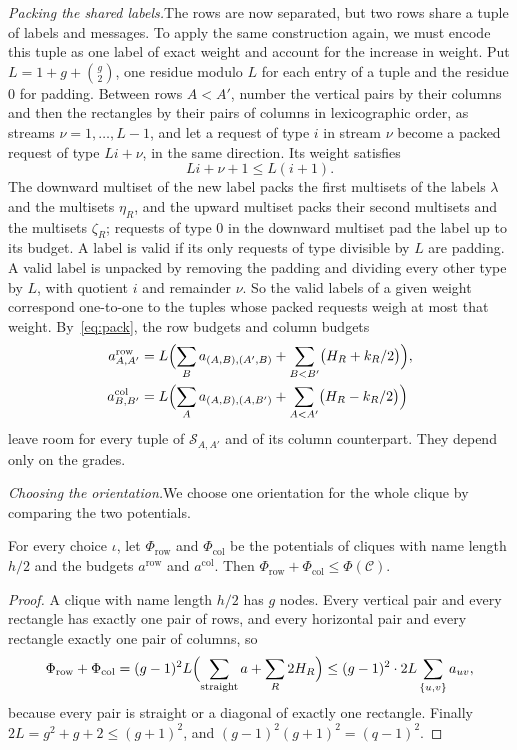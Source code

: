 \documentclass[11pt]{article}
\theoremstyle{definition}
\theoremstyle{definition}
\theoremstyle{remark}
\newcommand{\row}{\mathrm{row}}
\newcommand{\col}{\mathrm{col}}
\begin{document}
\noindent\emph{Packing the shared labels.}\quad The rows are now separated, but two rows share a tuple of labels and messages. To apply the same construction again, we must encode this tuple as one label of exact weight and account for the increase in weight. Put $L=1+g+\binom g2$, one residue modulo $L$ for each entry of a tuple and the residue $0$ for padding. Between rows $A<A'$, number the vertical pairs by their columns and then the rectangles by their pairs of columns in lexicographic order, as streams $\nu=1,\dots,L-1$, and let a request of type $i$ in stream $\nu$ become a packed request of type $Li+\nu$, in the same direction. Its weight satisfies
\begin{equation}\label{eq:pack}
Li+\nu+1\le L(i+1).
\end{equation}
The downward multiset of the new label packs the first multisets of the labels $\lambda$ and the multisets $\eta_R$, and the upward multiset packs their second multisets and the multisets $\zeta_R$; requests of type $0$ in the downward multiset pad the label up to its budget. A label is valid if its only requests of type divisible by $L$ are padding. A valid label is unpacked by removing the padding and dividing every other type by $L$, with quotient $i$ and remainder $\nu$. So the valid labels of a given weight correspond one-to-one to the tuples whose packed requests weigh at most that weight. By~\eqref{eq:pack}, the row budgets and column budgets
\begin{align*}
a^\row_{A,A'}&=L\Bigl(\sum_Ba_{(A,B),(A',B)}+\sum_{B<B'}\bigl(H_R+k_R/2\bigr)\Bigr),\\
a^\col_{B,B'}&=L\Bigl(\sum_Aa_{(A,B),(A,B')}+\sum_{A<A'}\bigl(H_R-k_R/2\bigr)\Bigr)
\end{align*}
leave room for every tuple of $\mathcal S_{A,A'}$ and of its column counterpart. They depend only on the grades.

\noindent\emph{Choosing the orientation.}\quad We choose one orientation for the whole clique by comparing the two potentials.

\begin{lemma}\label{lem:energy}
For every choice $\iota$, let $\Phi_\row$ and $\Phi_\col$ be the potentials of cliques with name length $h/2$ and the budgets $a^\row$ and $a^\col$. Then $\Phi_\row+\Phi_\col\le \Phi(\mathcal C)$.
\end{lemma}

\begin{proof}
A clique with name length $h/2$ has $g$ nodes. Every vertical pair and every rectangle has exactly one pair of rows, and every horizontal pair and every rectangle exactly one pair of columns, so
\[
\Phi_\row+\Phi_\col=(g-1)^2L\Bigl(\sum_{\text{straight}}a+\sum_R2H_R\Bigr)\le(g-1)^2\cdot2L\sum_{\{u,v\}}a_{uv},
\]
because every pair is straight or a diagonal of exactly one rectangle. Finally $2L=g^2+g+2\le(g+1)^2$, and $(g-1)^2(g+1)^2=(q-1)^2$.
\end{proof}
\end{document}

